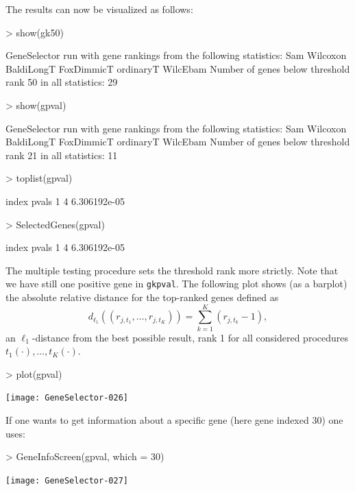 The results can now be visualized as follows:

\begin{Schunk}
\begin{Sinput}
> show(gk50)
\end{Sinput}
\begin{Soutput}
GeneSelector run with gene rankings from the following statistics: 
Sam 
Wilcoxon 
BaldiLongT 
FoxDimmicT 
ordinaryT 
WilcEbam 
Number of genes below threshold rank  50  in all statistics: 29 
\end{Soutput}
\begin{Sinput}
> show(gpval)
\end{Sinput}
\begin{Soutput}
GeneSelector run with gene rankings from the following statistics: 
Sam 
Wilcoxon 
BaldiLongT 
FoxDimmicT 
ordinaryT 
WilcEbam 
Number of genes below threshold rank  21  in all statistics: 11 
\end{Soutput}
\begin{Sinput}
> toplist(gpval)
\end{Sinput}
\begin{Soutput}
  index        pvals
1     4 6.306192e-05
\end{Soutput}
\begin{Sinput}
> SelectedGenes(gpval)
\end{Sinput}
\begin{Soutput}
  index        pvals
1     4 6.306192e-05
\end{Soutput}
\end{Schunk}

The multiple testing procedure sets the threshold rank more strictly.
Note that we have still one positive gene in \texttt{gkpval}.
The following plot shows (as a barplot) the absolute relative distance for the
top-ranked genes defined as
\begin{equation*}
d_{\ell_1}((r_{j,t_1},\ldots,r_{j,t_K})) = \sum_{k=1}^K (r_{j,t_k}-1),
\end{equation*}
an $\ell_1$-distance from the best possible result, rank 1 for all
considered procedures $t_1(\cdot),\ldots,t_K(\cdot)$.

\begin{Schunk}
\begin{Sinput}
> plot(gpval)
\end{Sinput}
\end{Schunk}
\texttt{[image: GeneSelector-026]}

If one wants to get information about a specific gene (here gene indexed 30)
one uses:

\begin{Schunk}
\begin{Sinput}
> GeneInfoScreen(gpval, which = 30)
\end{Sinput}
\end{Schunk}
\texttt{[image: GeneSelector-027]}





